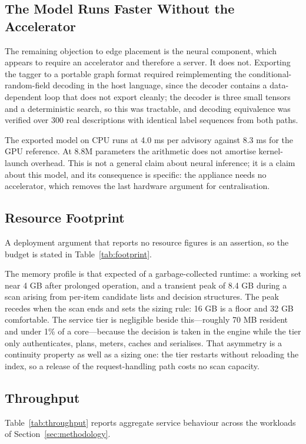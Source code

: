 \documentclass[fleqn,10pt,lineno]{wlpeerj}
\begin{document}
\subsection{The Model Runs Faster Without the Accelerator}
The remaining objection to edge placement is the neural component, which appears to require an accelerator and therefore a server. It does not. Exporting the tagger to a portable graph format \cite{onnx} required reimplementing the conditional-random-field decoding in the host language, since the decoder contains a data-dependent loop that does not export cleanly; the decoder is three small tensors and a deterministic search, so this was tractable, and decoding equivalence was verified over 300 real descriptions with identical label sequences from both paths.

The exported model on CPU runs at 4.0 ms per advisory against 8.3 ms for the GPU reference. At 8.8M parameters the arithmetic does not amortise kernel-launch overhead. This is not a general claim about neural inference; it is a claim about this model, and its consequence is specific: the appliance needs no accelerator, which removes the last hardware argument for centralisation.

\subsection{Resource Footprint}
\label{sec:footprint}
A deployment argument that reports no resource figures is an assertion, so the budget is stated in Table~\ref{tab:footprint}.



The memory profile is that expected of a garbage-collected runtime: a working set near 4 GB after prolonged operation, and a transient peak of 8.4 GB during a scan arising from per-item candidate lists and decision structures. The peak recedes when the scan ends and sets the sizing rule: 16 GB is a floor and 32 GB comfortable. The service tier is negligible beside this---roughly 70 MB resident and under 1\% of a core---because the decision is taken in the engine while the tier only authenticates, plans, meters, caches and serialises. That asymmetry is a continuity property as well as a sizing one: the tier restarts without reloading the index, so a release of the request-handling path costs no scan capacity.

\subsection{Throughput}
Table~\ref{tab:throughput} reports aggregate service behaviour across the workloads of Section~\ref{sec:methodology}.
\end{document}
